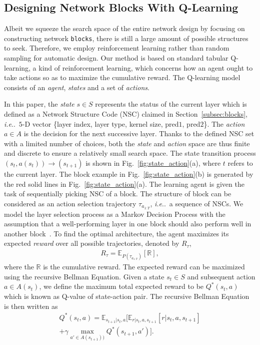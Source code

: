 \documentclass[10pt,journal,compsoc]{IEEEtran}
\makeatletter
\DeclareRobustCommand\onedot{\futurelet\@let@token\@onedot}
\def\@onedot{\ifx\@let@token.\else.\null\fi\xspace}
\def\ie{\emph{i.e}\onedot} \def\Ie{\emph{I.e}\onedot}
\makeatother
\begin{document}
\subsection{Designing Network Blocks With Q-Learning}
\label{subsec:q_learning}

Albeit we squeeze the search space of the entire network design by focusing on constructing network \texttt{blocks}, there is still a large amount of possible structures to seek. Therefore, we employ reinforcement learning rather than random sampling for automatic design. Our method is based on standard tabular Q-learning, a kind of reinforcement learning, which concerns how an agent ought to take actions so as to maximize the cumulative reward. The Q-learning model consists of an \textit{agent}, \textit{states} and a set of \textit{actions}. 

In this paper, the \textit{state} $s\in S$ represents the status of the current layer which is defined as a Network Structure Code (NSC) claimed in Section~\ref{subsec:blocks}, \ie~$5$-D vector \{layer index, layer type, kernel size, pred$1$, pred$2$\}. The \textit{action} $a\in A$ is the decision for the next successive layer. 
Thanks to the defined NSC set with a limited number of choices, both the \textit{state} and \textit{action} space are thus finite and discrete to ensure a relatively small search space. 
The state transition process $(s_t,a(s_t))\rightarrow (s_{t+1})$ is shown in Fig.~\ref{fig:state_action}(a), where $t$ refers to the current layer. The block example in Fig.~\ref{fig:state_action}(b) is generated by the red solid lines in Fig.~\ref{fig:state_action}(a).
The learning agent is given the task of sequentially picking NSC of a block. The structure of block can be considered as an action selection trajectory $\tau_{a_{1:T}}$, \ie~a sequence of NSCs. 
We model the layer selection process as a Markov Decision Process with the assumption that a well-performing layer in one block should also perform well in another block~\cite{baker2016designing}.
To find the optimal architecture, the agent maximizes its expected \textit{reward} over all possible trajectories, denoted by \(R_{\tau}\),
\begin{eqnarray}
R_{\tau}= \mathbb{E}_{P(\tau_{a_{1:T}})}[\mathbb{R}],
\end{eqnarray}
where the \(\mathbb{R}\) is the cumulative reward. The expected reward can be maximized using the recursive Bellman Equation. Given a state \(s_t\in S\) and subsequent action \(a\in A(s_t)\), we define the maximum total expected reward to be \(Q^*(s_t,a)\) which is known as Q-value of state-action pair. The recursive Bellman Equation is then written as 
\begin{eqnarray}
\nonumber Q^*(s_t,a)=\mathbb{E}_{s_{t+1}|s_t,a}[\mathbb{E}_{r|s_t,a,s_{t+1}}[r|s_t,a,s_{t+1}]\\
+\gamma \max_{a'\in A(s_{t+1}))}Q^*(s_{t+1},a')].
\end{eqnarray}
\end{document}
